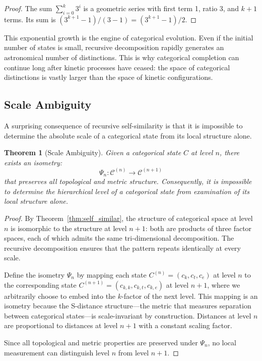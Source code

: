 \documentclass[12pt,a4paper]{article}
\newtheorem{theorem}{Theorem}[section]
\theoremstyle{definition}
\theoremstyle{remark}
\begin{document}
\begin{proof}
The sum $\sum_{i=0}^{k} 3^i$ is a geometric series with first term 1, ratio 3, and $k+1$ terms. Its sum is $(3^{k+1} - 1)/(3 - 1) = (3^{k+1} - 1)/2$.
\end{proof}

This exponential growth is the engine of categorical evolution. Even if the initial number of states is small, recursive decomposition rapidly generates an astronomical number of distinctions. This is why categorical completion can continue long after kinetic processes have ceased: the space of categorical distinctions is vastly larger than the space of kinetic configurations.

\subsection{Scale Ambiguity}

A surprising consequence of recursive self-similarity is that it is impossible to determine the absolute scale of a categorical state from its local structure alone.

\begin{theorem}[Scale Ambiguity]
\label{thm:scale_ambiguity}
Given a categorical state $C$ at level $n$, there exists an isometry:
\begin{equation}
\Psi_n: \mathcal{C}^{(n)} \to \mathcal{C}^{(n+1)}
\end{equation}
that preserves all topological and metric structure. Consequently, it is impossible to determine the hierarchical level of a categorical state from examination of its local structure alone.
\end{theorem}

\begin{proof}
By Theorem~\ref{thm:self_similar}, the structure of categorical space at level $n$ is isomorphic to the structure at level $n+1$: both are products of three factor spaces, each of which admits the same tri-dimensional decomposition. The recursive decomposition ensures that the pattern repeats identically at every scale.

Define the isometry $\Psi_n$ by mapping each state $C^{(n)} = (c_k, c_t, c_e)$ at level $n$ to the corresponding state $C^{(n+1)} = (c_{k,k}, c_{k,t}, c_{k,e})$ at level $n+1$, where we arbitrarily choose to embed into the $k$-factor of the next level. This mapping is an isometry because the S-distance structure—the metric that measures separation between categorical states—is scale-invariant by construction. Distances at level $n$ are proportional to distances at level $n+1$ with a constant scaling factor.

Since all topological and metric properties are preserved under $\Psi_n$, no local measurement can distinguish level $n$ from level $n+1$.
\end{proof}
\end{document}
